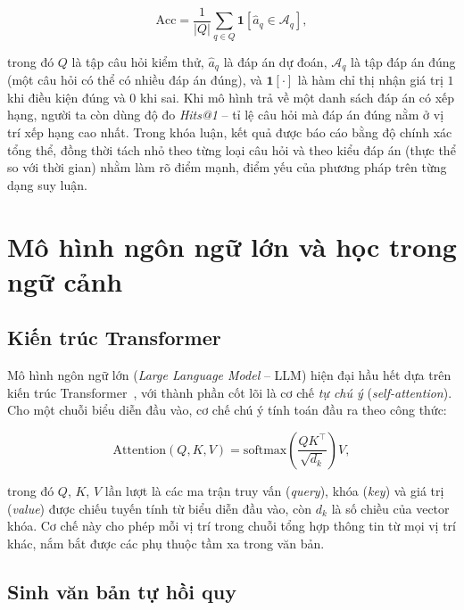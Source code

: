 \begin{equation}
\label{eq:accuracy}
\mathrm{Acc} = \frac{1}{|Q|} \sum_{q \in Q} \mathbf{1}\!\left[\hat{a}_q \in \mathcal{A}_q\right],
\end{equation}

trong đó $Q$ là tập câu hỏi kiểm thử, $\hat{a}_q$ là đáp án dự đoán, $\mathcal{A}_q$ là tập đáp án
đúng (một câu hỏi có thể có nhiều đáp án đúng), và $\mathbf{1}[\cdot]$ là hàm chỉ thị nhận giá trị
$1$ khi điều kiện đúng và $0$ khi sai. Khi mô hình trả về một danh sách đáp án có xếp hạng, người
ta còn dùng độ đo \textit{Hits@1} -- tỉ lệ câu hỏi mà đáp án đúng nằm ở vị trí xếp hạng cao nhất.
Trong khóa luận, kết quả được báo cáo bằng độ chính xác tổng thể, đồng thời tách nhỏ theo từng loại
câu hỏi và theo kiểu đáp án (thực thể so với thời gian) nhằm làm rõ điểm mạnh, điểm yếu của phương
pháp trên từng dạng suy luận.

\section{Mô hình ngôn ngữ lớn và học trong ngữ cảnh}
\label{sec:llm}

\subsection{Kiến trúc Transformer}

Mô hình ngôn ngữ lớn (\textit{Large Language Model} -- LLM) hiện đại hầu hết dựa trên kiến trúc
Transformer~\cite{vaswani2017attention}, với thành phần cốt lõi là cơ chế \textit{tự chú ý}
(\textit{self-attention}). Cho một chuỗi biểu diễn đầu vào, cơ chế chú ý tính toán đầu ra theo
công thức:

\begin{equation}
\label{eq:attention}
\mathrm{Attention}(Q, K, V) = \mathrm{softmax}\!\left(\frac{Q K^{\top}}{\sqrt{d_k}}\right) V,
\end{equation}

trong đó $Q$, $K$, $V$ lần lượt là các ma trận truy vấn (\textit{query}), khóa (\textit{key}) và
giá trị (\textit{value}) được chiếu tuyến tính từ biểu diễn đầu vào, còn $d_k$ là số chiều của
vector khóa. Cơ chế này cho phép mỗi vị trí trong chuỗi tổng hợp thông tin từ mọi vị trí khác,
nắm bắt được các phụ thuộc tầm xa trong văn bản.

\subsection{Sinh văn bản tự hồi quy}

